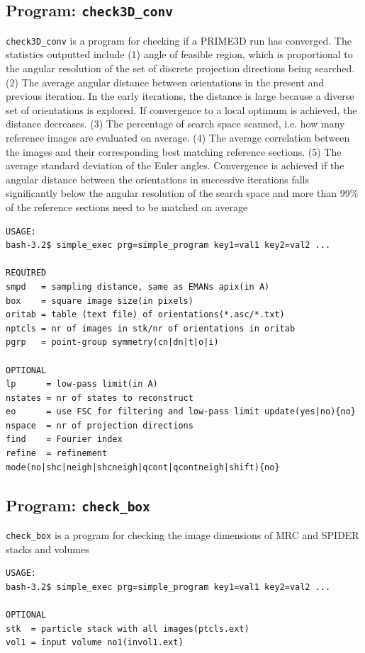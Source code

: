\documentclass[a4paper,11pt]{article}
\newcommand{\prgname}[1]{\textcolor{NavyBlue}{\texttt{#1}}}
\begin{document}
\subsection{Program: \prgname{check3D\_conv}}
\label{check3D_conv}
\prgname{check3D\_conv} is a program for checking if a PRIME3D run has converged. The statistics outputted include (1) angle of feasible region, which is proportional to the angular resolution of the set of discrete projection directions being searched. (2) The average angular distance between orientations in the present and previous iteration. In the early iterations, the distance is large because a diverse set of orientations is explored. If convergence to a local optimum is achieved, the distance decreases. (3) The percentage of search space scanned, i.e. how many reference images are evaluated on average. (4) The average correlation between the images and their corresponding best matching reference sections. (5) The average standard deviation of the Euler angles. Convergence is achieved if the angular distance between the orientations in successive iterations falls significantly below the angular resolution of the search space and more than 99\% of the reference sections need to be matched on average 

\begin{verbatim}
USAGE:
bash-3.2$ simple_exec prg=simple_program key1=val1 key2=val2 ...

REQUIRED
smpd   = sampling distance, same as EMANs apix(in A)
box    = square image size(in pixels)
oritab = table (text file) of orientations(*.asc/*.txt)
nptcls = nr of images in stk/nr of orientations in oritab
pgrp   = point-group symmetry(cn|dn|t|o|i)

OPTIONAL
lp      = low-pass limit(in A)
nstates = nr of states to reconstruct
eo      = use FSC for filtering and low-pass limit update(yes|no){no}
nspace  = nr of projection directions
find    = Fourier index
refine  = refinement mode(no|shc|neigh|shcneigh|qcont|qcontneigh|shift){no}
\end{verbatim}

\subsection{Program: \prgname{check\_box}}
\label{check_box}
\prgname{check\_box} is a program for checking the image dimensions of MRC and SPIDER stacks and volumes

\begin{verbatim}
USAGE:
bash-3.2$ simple_exec prg=simple_program key1=val1 key2=val2 ...

OPTIONAL
stk  = particle stack with all images(ptcls.ext)
vol1 = input volume no1(invol1.ext)
\end{verbatim}
\end{document}
